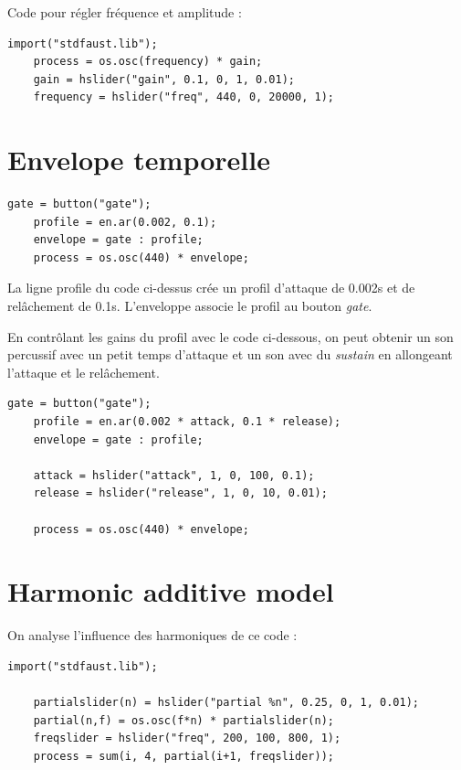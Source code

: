 \documentclass[12pt]{report}
\begin{document}
Code pour régler fréquence et amplitude :

\begin{lstlisting}[language=Faust]
    import("stdfaust.lib");
    process = os.osc(frequency) * gain;
    gain = hslider("gain", 0.1, 0, 1, 0.01);
    frequency = hslider("freq", 440, 0, 20000, 1);
\end{lstlisting}

\section{Envelope temporelle}

\begin{lstlisting}[language=Faust]
    gate = button("gate");
    profile = en.ar(0.002, 0.1);
    envelope = gate : profile;
    process = os.osc(440) * envelope;
\end{lstlisting}

La ligne profile du code ci-dessus crée un profil d'attaque de 0.002s et de relâchement de 0.1s. %
L'enveloppe associe le profil au bouton \textit{gate}.

En contrôlant les gains du profil avec le code ci-dessous, on peut obtenir un son %
percussif avec un petit temps d'attaque et un son avec du \textit{sustain} en allongeant l'attaque %
et le relâchement.

\begin{lstlisting}[language=Faust]
    gate = button("gate");
    profile = en.ar(0.002 * attack, 0.1 * release);
    envelope = gate : profile;

    attack = hslider("attack", 1, 0, 100, 0.1);
    release = hslider("release", 1, 0, 10, 0.01);

    process = os.osc(440) * envelope;
\end{lstlisting}

\section{Harmonic additive model}
On analyse l'influence des harmoniques de ce code : 

\begin{lstlisting}[language=Faust]
    import("stdfaust.lib");

    partialslider(n) = hslider("partial %n", 0.25, 0, 1, 0.01);
    partial(n,f) = os.osc(f*n) * partialslider(n);
    freqslider = hslider("freq", 200, 100, 800, 1);
    process = sum(i, 4, partial(i+1, freqslider));
\end{lstlisting}
\end{document}
